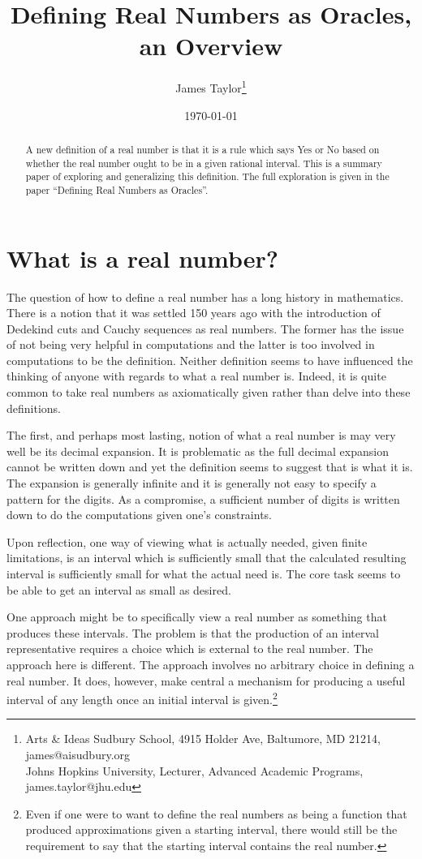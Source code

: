 \documentclass[12pt]{article}
\title{Defining Real Numbers as Oracles, an Overview}
\author{
  James Taylor\footnote{Arts \& Ideas Sudbury School, 4915 Holder Ave, Baltumore, MD 21214, james@aisudbury.org \\
  \hspace*{15px} Johns Hopkins University, Lecturer, Advanced Academic Programs, james.taylor@jhu.edu}
}
\date{\today}
\theoremstyle{remark}
\begin{document}
\maketitle
\begin{abstract}
A new definition of a real number is that it is a rule which says Yes or No based on whether the real number ought to be in a given rational interval. This is a summary paper of exploring and generalizing this definition. The full exploration is given in the paper ``Defining Real Numbers as Oracles''. 
\end{abstract}


\section{What is a real number?}

The question of how to define a real number has a long history in mathematics. There is a notion that it was settled 150 years ago with the introduction of Dedekind cuts and Cauchy sequences as real numbers. The former has the issue of not being very helpful in computations and the latter is too involved in computations to be the definition. Neither definition seems to have influenced the thinking of anyone with regards to what a real number is. Indeed, it is quite common to take real numbers as axiomatically given rather than delve into these definitions.

The first, and perhaps most lasting, notion of what a real number is may very well be its decimal expansion. It is problematic as the full decimal expansion cannot be written down and yet the definition seems to suggest that is what it is. The expansion is generally infinite and it is generally not easy to specify a pattern for the digits. As a compromise, a sufficient number of digits is written down to do the computations given one's constraints.  

Upon reflection, one way of viewing what is actually needed, given finite limitations, is an interval which is sufficiently small that the calculated resulting interval is sufficiently small for what the actual need is. The core task seems to be able to get an interval as small as desired. 

One approach might be to specifically view a real number as something that produces these intervals. The problem is that the production of an interval representative requires a choice which is external to the real number. The approach here is different. The approach involves no arbitrary choice in defining a real number. It does, however, make central a mechanism for producing a useful interval of any length once an initial interval is given.\footnote{Even if one were to want to define the real numbers as being a function that produced approximations given a starting interval, there would still be the requirement to say that the starting interval contains the real number.}
\end{document}
